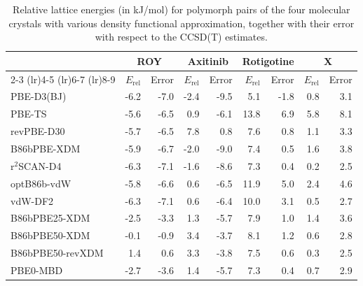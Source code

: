 \begin{table}[h]

\caption{\label{tab:pharma_dft_comparison}Relative lattice energies (in kJ/mol) for polymorph pairs of the four molecular crystals with various density functional approximation, together with their error with respect to the CCSD(T) estimates.}
\begin{tabular}{lrrrrrrrr}
\toprule
 & \multicolumn{2}{c}{ROY} & \multicolumn{2}{c}{Axitinib} & \multicolumn{2}{c}{Rotigotine} & \multicolumn{2}{c}{X} \\ \cmidrule(lr){2-3} \cmidrule(lr){4-5} \cmidrule(lr){6-7} \cmidrule(lr){8-9} 
 & $E_\text{rel}$ & Error & $E_\text{rel}$ & Error & $E_\text{rel}$ & Error & $E_\text{rel}$ & Error \\
\midrule
PBE-D3(BJ) & -6.2 & -7.0 & -2.4 & -9.5 & 5.1 & -1.8 & 0.8 & 3.1 \\
PBE-TS & -5.6 & -6.5 & 0.9 & -6.1 & 13.8 & 6.9 & 5.8 & 8.1 \\
revPBE-D30 & -5.7 & -6.5 & 7.8 & 0.8 & 7.6 & 0.8 & 1.1 & 3.3 \\
B86bPBE-XDM & -5.9 & -6.7 & -2.0 & -9.0 & 7.4 & 0.5 & 1.6 & 3.8 \\
r$^2$SCAN-D4 & -6.3 & -7.1 & -1.6 & -8.6 & 7.3 & 0.4 & 0.2 & 2.5 \\
optB86b-vdW & -5.8 & -6.6 & 0.6 & -6.5 & 11.9 & 5.0 & 2.4 & 4.6 \\
vdW-DF2 & -6.3 & -7.1 & 0.6 & -6.4 & 10.0 & 3.1 & 0.5 & 2.7 \\
B86bPBE25-XDM & -2.5 & -3.3 & 1.3 & -5.7 & 7.9 & 1.0 & 1.4 & 3.6 \\
B86bPBE50-XDM & -0.1 & -0.9 & 3.4 & -3.7 & 8.1 & 1.2 & 0.6 & 2.8 \\
B86bPBE50-revXDM & 1.4 & 0.6 & 3.3 & -3.8 & 7.5 & 0.6 & 0.3 & 2.5 \\
PBE0-MBD & -2.7 & -3.6 & 1.4 & -5.7 & 7.3 & 0.4 & 0.7 & 2.9 \\
\bottomrule
\end{tabular}

\end{table}